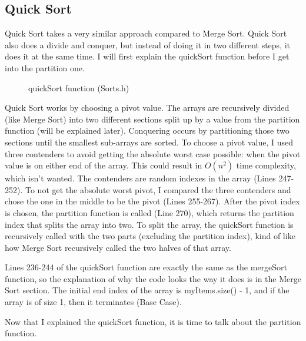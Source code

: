 \documentclass[letterpaper, 10pt]{article}
\begin{document}
\vspace{3em}
\subsection{Quick Sort}
\noindent
Quick Sort takes a very similar approach compared to Merge Sort. Quick Sort also does a divide and conquer, but instead of doing it in two different steps, it does it at the same time. I will first explain the quickSort function before I get into the partition one.
\begin{figure}[H]
  \centering
  
  \label{fig:figure4.7-part1}
\end{figure}

\begin{figure}[H]
  \centering
  
  \caption{quickSort function (Sorts.h)}
  \label{fig:figure4.7-part2}
\end{figure}
\noindent
Quick Sort works by choosing a pivot value. The arrays are recursively divided (like Merge Sort) into two different sections split up by a value from the partition function (will be explained later). Conquering occurs by partitioning those two sections until the smallest sub-arrays are sorted. To choose a pivot value, I used three contenders to avoid getting the absolute worst case possible: when the pivot value is on either end of the array. This could result in $O(n^2)$ time complexity, which isn't wanted. The contenders are random indexes in the array (Lines 247-252). To not get the absolute worst pivot, I compared the three contenders and chose the one in the middle to be the pivot (Lines 255-267). After the pivot index is chosen, the partition function is called (Line 270), which returns the partition index that splits the array into two. To split the array, the quickSort function is recursively called with the two parts (excluding the partition index), kind of like how Merge Sort recursively called the two halves of that array.

\noindent
Lines 236-244 of the quickSort function are exactly the same as the mergeSort function, so the explanation of why the code looks the way it does is in the Merge Sort section. The initial end index of the array is myItems.size() - 1, and if the array is of size 1, then it terminates (Base Case). 

\noindent
Now that I explained the quickSort function, it is time to talk about the partition function.
\begin{figure}[H]
  \centering
  
  \label{fig:figure4.8-part1}
\end{figure}
\end{document}

